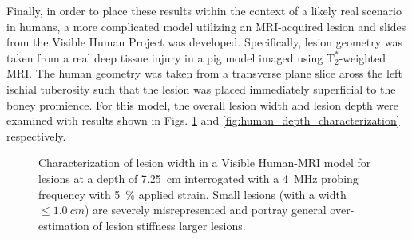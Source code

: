 			Finally, in order to place these results within the context of a likely real scenario in humans, a more complicated model utilizing an MRI-acquired lesion and slides from the Visible Human Project \cite{visiblehuman} was developed. Specifically, lesion geometry was taken from a real deep tissue injury in a pig model imaged using $\mathrm{T}_2^*$-weighted MRI. The human geometry was taken from a transverse plane slice aross the left ischial tuberosity such that the lesion was placed immediately superficial to the boney promience. For this model, the overall lesion width and lesion depth were examined with results shown in Figs. \ref{fig:human_size_characterization} and \ref{fig:human_depth_characterization} respectively.

			\begin{figure}[!t]
				\centering
				\caption[Lesion width characterization in a Visible Human-MRI model]{Characterization of lesion width in a Visible Human-MRI model for lesions at a depth of \SI{7.25}{cm} interrogated with a \SI{4}{MHz} probing frequency with \SI{5}{\percent} applied strain. Small lesions (with a width $\leq \SI{1.0}{cm}$) are severely misrepresented and portray general over-estimation of lesion stiffness larger lesions.}
				\label{fig:human_size_characterization}
			\end{figure}

